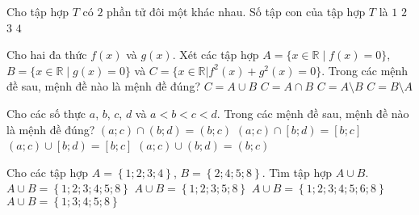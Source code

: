 \begin{ex}%
	Cho tập hợp $T$ có $2$ phần tử đôi một khác nhau. Số tập con của tập hợp $T$ là
	\choice
	{$1$}
	{$2$}
	{$3$}
	{\True $4$}
\end{ex}
\begin{ex}%
	Cho hai đa thức $f(x)$ và $g(x)$. Xét các tập hợp $A=\{x\in\mathbb{R}\;\big|\;f(x)=0\}$, $B=\{x\in\mathbb{R}\;\big|\;g(x)=0\}$ và $C=\{x\in\mathbb{R}|f^2(x)+g^2(x)=0\}$. Trong các mệnh đề sau, mệnh đề nào là mệnh đề đúng?
	\choice
	{$C=A\cup B$}
	{\True $C=A\cap B$}
	{$C=A\setminus B$}
	{$C=B\setminus A$}
\end{ex}
\begin{ex}%
	Cho các số thực $a$, $b$, $c$, $d$ và $a<b<c<d$. Trong các mệnh đề sau, mệnh đề nào là mệnh đề đúng?
	\choice
	{\True$\left(a;c\right)\cap\left(b;d\right)=\left(b;c\right)$}
	{$\left(a;c\right)\cap\left[b;d\right)=\left[b;c\right]$}
	{$\left(a;c\right)\cup\left[b;d\right)=\left[b;c\right]$}
	{$\left(a;c\right)\cup\left(b;d\right)=\left(b;c\right)$}
\end{ex}
\begin{ex}%
	Cho các tập hợp $A=\left\{1; 2; 3; 4\right\}$,  $B=\left\{2; 4; 5; 8\right\}$. Tìm tập hợp $A\cup B$.
	\choice
	{\True $A\cup B=\left\{1; 2; 3; 4; 5; 8\right\}$}
	{$A\cup B=\left\{1; 2; 3; 5; 8\right\}$}
	{$A\cup B=\left\{1; 2; 3; 4; 5; 6; 8\right\}$}
	{$A\cup B=\left\{1; 3; 4; 5; 8\right\}$}
\end{ex}
